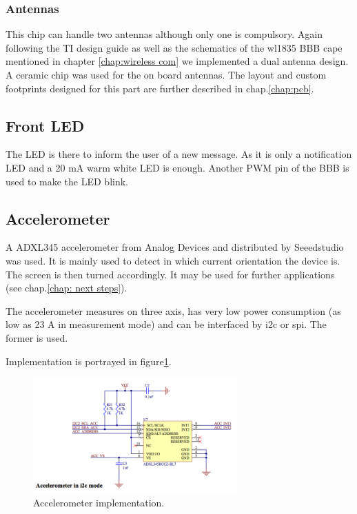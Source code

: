 \subsubsection{Antennas}
This chip can handle two antennas although only one is compulsory. Again following the TI design guide as well as the schematics of the wl1835 BBB cape mentioned in chapter \ref{chap:wireless com} we implemented a dual antenna design. A ceramic chip was used for the on board antennas. The layout and custom footprints designed for this part are further described in chap.\ref{chap:pcb}.


\subsection{Front LED}

The LED is there to inform the user of a new message. As it is only a notification LED and a 20 mA warm white LED is enough. Another PWM pin of the BBB is used to make the LED blink.


\subsection{Accelerometer}

A ADXL345 accelerometer from Analog Devices and distributed by Seeedstudio was used. It is mainly used to detect in which current orientation the device is. The screen is then turned accordingly. It may be used for further applications (see chap.\ref{chap: next steps}).

The accelerometer measures on three axis, has very low power consumption (as low as 23 \textmu A in measurement mode) and can be interfaced by i2c or spi. The former is used.

Implementation is portrayed in figure\ref{fig:acc}.
\begin{figure}[!ht]
    \centering
    \includegraphics[width=0.7\textwidth,keepaspectratio]{chap/hardFig/acc_sch}
    \caption{Accelerometer implementation.}
    \label{fig:acc}
\end{figure}

